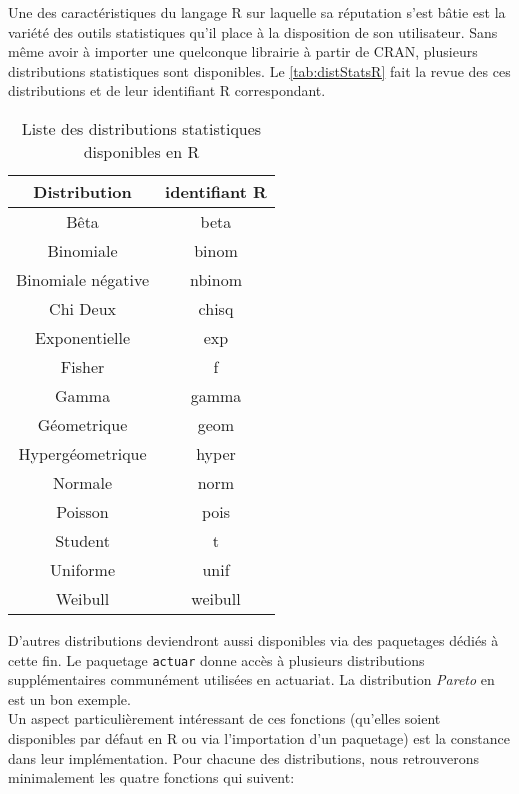 Une des caractéristiques du langage R sur laquelle sa réputation s'est bâtie est la variété des outils statistiques qu'il place à la disposition de son utilisateur. Sans même avoir à importer une quelconque librairie à partir de CRAN, plusieurs distributions statistiques sont disponibles. Le \autoref{tab:distStatsR} fait la revue des ces distributions et de leur identifiant R correspondant. \cite{distStatsR} \\

\begin{table}[ht]
	\centering
	\begin{tabular}{cc}
		\textbf{Distribution} & \textbf{identifiant R} \\
		\hline
		Bêta & beta \\
		Binomiale & binom \\
		Binomiale négative & nbinom \\
		Chi Deux & chisq \\
		Exponentielle & exp \\
		Fisher & f \\
		Gamma & gamma \\
		Géometrique & geom \\
		Hypergéometrique & hyper \\
		Normale & norm \\
		Poisson & pois \\
		Student & t \\
		Uniforme & unif \\
		Weibull & weibull
	\end{tabular}
	\caption{Liste des distributions statistiques disponibles en R}
\end{table}
\label{tab:distStatsR}

D'autres distributions deviendront aussi disponibles via des paquetages dédiés à cette fin. Le paquetage \texttt{actuar} \cite{pkgR:actuar} donne accès à plusieurs distributions supplémentaires communément utilisées en actuariat. La distribution \emph{Pareto} en est un bon exemple. \\

Un aspect particulièrement intéressant de ces fonctions (qu'elles soient disponibles par défaut en R ou via l'importation d'un paquetage) est la constance dans leur implémentation. Pour chacune des distributions, nous retrouverons minimalement les quatre fonctions qui suivent: \\

